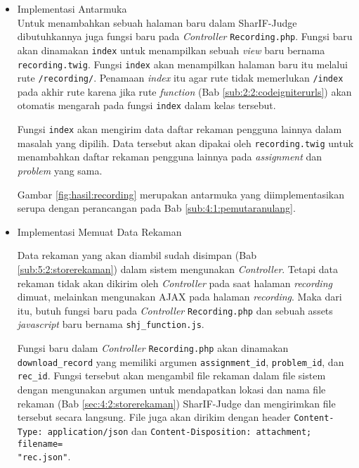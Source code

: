 \begin{itemize}
    \item {Implementasi Antarmuka} \\
    Untuk menambahkan sebuah halaman baru dalam SharIF-Judge dibutuhkannya juga fungsi baru pada \textit{Controller} \verb|Recording.php|. Fungsi baru akan dinamakan \verb|index| untuk menampilkan sebuah \textit{view} baru bernama \verb|recording.twig|. Fungsi \verb|index| akan menampilkan halaman baru itu melalui rute \verb|/recording/|. Penamaan \textit{index} itu agar rute tidak memerlukan \verb|/index| pada akhir rute karena jika rute \textit{function} (Bab \ref{sub:2:2:codeigniterurls}) akan otomatis mengarah pada fungsi \verb|index| dalam kelas tersebut.

    Fungsi \verb|index| akan mengirim data daftar rekaman pengguna lainnya dalam masalah yang dipilih. Data tersebut akan dipakai oleh \verb|recording.twig| untuk menambahkan daftar rekaman pengguna lainnya pada \textit{assignment} dan \textit{problem} yang sama.

    Gambar \ref{fig:hasil:recording} merupakan antarmuka yang diimplementasikan serupa dengan perancangan pada Bab \ref{sub:4:1:pemutaranulang}.

    \item Implementasi Memuat Data Rekaman \\
    \label{ssub:5:2:4:memuatdata}

    Data rekaman yang akan diambil sudah disimpan (Bab \ref{sub:5:2:storerekaman}) dalam sistem mengunakan \textit{Controller}. Tetapi data rekaman tidak akan dikirim oleh \textit{Controller} pada saat halaman \textit{recording} dimuat, melainkan mengunakan AJAX pada halaman \textit{recording}. Maka dari itu, butuh fungsi baru pada \textit{Controller} \verb|Recording.php| dan sebuah assets \textit{javascript} baru bernama \verb|shj_function.js|.

    Fungsi baru dalam \textit{Controller} \verb|Recording.php| akan dinamakan \verb|download_record| yang memiliki argumen \verb|assignment_id|, \verb|problem_id|, dan \verb|rec_id|. Fungsi tersebut akan mengambil file rekaman dalam file sistem dengan mengunakan argumen untuk mendapatkan lokasi dan nama file rekaman (Bab \ref{sec:4:2:storerekaman}) SharIF-Judge dan mengirimkan file tersebut secara langsung. File juga akan dirikim dengan header \verb|Content-Type: application/json| dan \verb|Content-Disposition: attachment; filename=|\\\verb|"rec.json"|.


\end{itemize}
